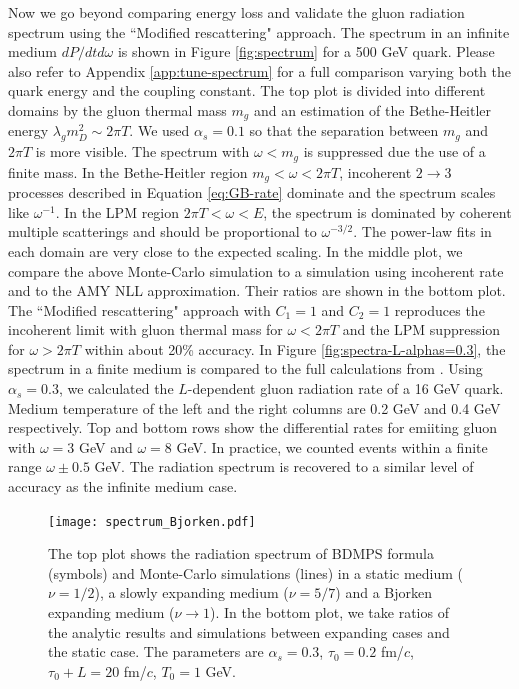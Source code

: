 \documentclass[aps, prc, reprint, amsmath, groupedaddress, nofootinbib]{revtex4-1}
\begin{document}
{Now we go beyond comparing energy loss and validate the gluon radiation spectrum using the ``Modified rescattering" approach. 
The spectrum in an infinite medium $dP/dtd\omega$ is shown in Figure \ref{fig:spectrum} for a 500 GeV quark.
Please also refer to Appendix \ref{app:tune-spectrum} for a full comparison varying both the quark energy and the coupling constant.
The top plot is divided into different domains by the gluon thermal mass $m_g$ and an estimation of the Bethe-Heitler energy $\lambda_g m_D^2 \sim 2\pi T$.
We used $\alpha_s = 0.1$ so that the separation between $m_g$ and $2\pi T$ is more visible.
The spectrum with $\omega < m_g$ is suppressed due the use of a finite mass.
In the Bethe-Heitler region $m_g < \omega < 2\pi T$, incoherent $2\rightarrow 3$ processes described in Equation \ref{eq:GB-rate} dominate and the spectrum scales like $\omega^{-1}$.
In the LPM region $2\pi T < \omega < E$, the spectrum is dominated by coherent multiple scatterings and should be proportional to $\omega^{-3/2}$.
The power-law fits in each domain are very close to the expected scaling.
In the middle plot, we compare the above Monte-Carlo simulation to a simulation using incoherent rate and to the AMY NLL approximation. 
Their ratios are shown in the bottom plot.
The ``Modified rescattering" approach with $C_1 = 1$ and $C_2 = 1$ reproduces the incoherent limit with gluon thermal mass for $\omega < 2\pi T$ and the LPM suppression for $\omega > 2\pi T$ within about 20\% accuracy.
In Figure \ref{fig:spectra-L-alphas=0.3}, the spectrum in a finite medium is compared to the full calculations from \cite{CaronHuot:2008uh}.
Using $\alpha_s = 0.3$, we calculated the $L$-dependent gluon radiation rate of a 16 GeV quark.
Medium temperature of the left and the right columns are 0.2 GeV and 0.4 GeV respectively.
Top and bottom rows show the differential rates for emiiting gluon with $\omega = 3$ GeV and $\omega = 8$ GeV. 
In practice, we counted events within a finite range $\omega\pm 0.5$ GeV.
The radiation spectrum is recovered to a similar level of accuracy as the infinite medium case.

\begin{figure}
\texttt{[image: spectrum\_Bjorken.pdf]}
\caption{The top plot shows the radiation spectrum of BDMPS formula (symbols) and Monte-Carlo simulations (lines) in a static medium ($\nu=1/2$), a slowly expanding medium ($\nu=5/7$) and a Bjorken expanding medium ($\nu\rightarrow 1$). In the bottom plot, we take ratios of the analytic results and simulations between expanding cases and the static case. The parameters are $\alpha_s=0.3$, $\tau_0 = 0.2$ fm/$c$, $\tau_0+L = 20$ fm/$c$, $T_0 = 1$ GeV.}
\label{fig:Bjorken-BDMPS}
\end{figure}

}
\end{document}

